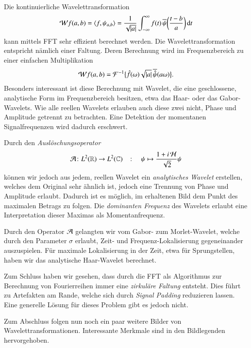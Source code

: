 Die kontinuierliche Wavelettransformation 
\begin{equation}
\Wave f (a,b)
=
\langle f,\psi_{a,b}\rangle
=
\frac{1}{\sqrt{|a|}}\int_{-\infty}^\infty f(t)\,
\overline{\psi}\biggl(\frac{t-b}{a}\biggr)\,\mathrm{d}t
\end{equation}
kann mittels FFT sehr effizient berechnet werden.
Die Wavelettransformation entspricht nämlich einer Faltung.
Deren Berechnung wird im Frequenzbereich zu einer einfachen Multiplikation
\begin{equation}
\Wave f(a,b)
= \mathcal{F}^{-1}\bigl\lbrace\hat{f}(\omega) \sqrt{|a|}\, \overline{\hat{\psi}}(a\omega)\bigr\rbrace.
\end{equation}
Besonders interessant ist diese Berechnung mit Wavelet, die eine geschlossene, analytische Form im Frequenzbereich besitzen, etwa das Haar- oder das Gabor-Wavelets.
Wie alle reellen Wavelets erlauben auch diese zwei nicht, Phase und Amplitude getrennt zu betrachten.
Eine Detektion der momentanen Signalfrequenzen wird dadurch erschwert.

Durch den \emph{Auslöschungsoperator}
\[
	\Ana\, \colon L^2(\mathbb R) \to L^2(\mathbb C)
	\quad\colon\quad
	\psi \mapsto \frac{1 + i\Hilb\,}{\sqrt 2}\psi
\]
können wir jedoch aus jedem, reellen Wavelet ein \emph{analytisches Wavelet} erstellen, welches dem Original sehr ähnlich ist, jedoch eine Trennung von Phase und Amplitude erlaubt.
Dadurch ist es möglich, im erhaltenen Bild dem Punkt des maximalen Betrags zu folgen.
Die \emph{dominanten Frequenz} des Wavelets erlaubt eine Interpretation dieser Maximas als Momentanfrequenz.

Durch den Operator $\Ana\,$ gelangten wir vom Gabor- zum Morlet-Wavelet, welche durch den Parameter $\sigma$ erlaubt, Zeit- und Frequenz-Lokalisierung gegeneinander auszuspielen.
Für maximale Lokalisierung in der Zeit, etwa für Sprungstellen, haben wir das analytische Haar-Wavelet berechnet.

Zum Schluss haben wir gesehen, dass durch die FFT als Algorithmus zur Berechnung von Fourierreihen immer eine \emph{zirkuläre Faltung} entsteht.
Dies führt zu Artefakten am Rande, welche sich durch \emph{Signal Padding} reduzieren lassen.
Eine generelle Lösung für dieses Problem gibt es jedoch nicht.

Zum Abschluss folgen nun noch ein paar weitere Bilder von Wavelettransformationen.
Interessante Merkmale sind in den Bildlegenden hervorgehoben.


